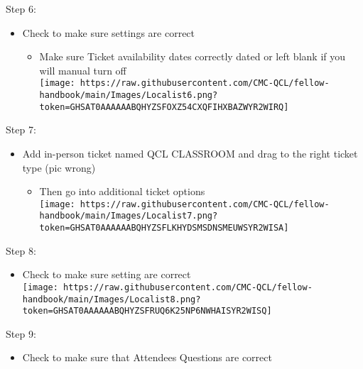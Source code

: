 \documentclass[
]{book}
\providecommand{\tightlist}{%
  \setlength{\itemsep}{0pt}\setlength{\parskip}{0pt}}
\begin{document}
Step 6:

\begin{itemize}
\tightlist
\item
  Check to make sure settings are correct

  \begin{itemize}
  \tightlist
  \item
    Make sure Ticket availability dates correctly dated or left blank if you will manual turn off\\
    \texttt{[image: https://raw.githubusercontent.com/CMC-QCL/fellow-handbook/main/Images/Localist6.png?token=GHSAT0AAAAAABQHYZSFOXZ54CXQFIHXBAZWYR2WIRQ]}
  \end{itemize}
\end{itemize}

Step 7:

\begin{itemize}
\tightlist
\item
  Add in-person ticket named QCL CLASSROOM and drag to the right ticket type (pic wrong)

  \begin{itemize}
  \tightlist
  \item
    Then go into additional ticket options\\
    \texttt{[image: https://raw.githubusercontent.com/CMC-QCL/fellow-handbook/main/Images/Localist7.png?token=GHSAT0AAAAAABQHYZSFLKHYDSMSDNSMEUWSYR2WISA]}
  \end{itemize}
\end{itemize}

Step 8:

\begin{itemize}
\tightlist
\item
  Check to make sure setting are correct\\
  \texttt{[image: https://raw.githubusercontent.com/CMC-QCL/fellow-handbook/main/Images/Localist8.png?token=GHSAT0AAAAAABQHYZSFRUQ6K25NP6NWHAISYR2WISQ]}
\end{itemize}

Step 9:

\begin{itemize}
\tightlist
\item
  Check to make sure that Attendees Questions are correct
\end{itemize}
\end{document}
